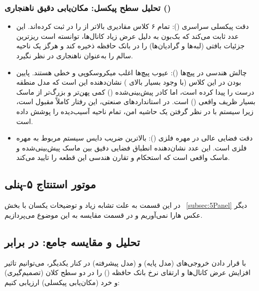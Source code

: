 \documentclass{article}
\begin{document}
\subsubsection{تحلیل سطح پیکسل: مکان‌یابی دقیق ناهنجاری ()}
	\begin{itemize}
		\item دقت پیکسلی سراسری (): تمام ۶ کلاس مقادیری بالاتر از  را در  ثبت کرده‌اند. این عدد ثابت می‌کند که بک‌بون  به دلیل عرض زیاد کانال‌ها، توانسته است ریزترین جزئیات بافتی (لبه‌ها و گرادیان‌ها) را در بانک حافظه ذخیره کند و هرگز یک ناحیه سالم را به‌عنوان ناهنجاری در نظر نگیرد.
		
		\item چالش هندسی در پیچ‌ها (): عیوب پیچ‌ها اغلب میکروسکوپی و خطی هستند. پایین بودن  در این کلاس (با وجود  بسیار بالای ) نشان‌دهنده این است که مدل منطقه درست را پیدا کرده است، اما کادر پیش‌بینی‌شده () کمی پهن‌تر و بزرگ‌تر از ماسک بسیار ظریف واقعی () است. در استانداردهای صنعتی، این رفتار کاملاً مقبول است، زیرا سیستم با در نظر گرفتن یک حاشیه امن، تمام ناحیه آسیب‌دیده را پوشش داده است.
		
		\item دقت فضایی عالی در مهره فلزی (): بالاترین ضریب دایس سیستم مربوط به مهره فلزی است. این عدد نشان‌دهنده انطباق فضایی دقیق بین ماسک پیش‌بینی‌شده و ماسک واقعی است که استحکام و تقارن هندسی این قطعه را تایید می‌کند.
	\end{itemize}



\subsection{موتور استنتاج  ۵-پنلی }
در این قسمت به علت تشابه زیاد و توضیحات یکسان با بخش ~\ref{subsec:5Panel}
دیگر عکس هارا نمی‌آوریم و در قسمت مقایسه به این موضوع می‌پردازیم.


\subsection{تحلیل و مقایسه جامع:  در برابر }

با قرار دادن خروجی‌های  (مدل پایه) و  (مدل پیشرفته) در کنار یکدیگر، می‌توانیم تاثیر افزایش عرض کانال‌ها و ارتقای نرخ بانک حافظه () را در دو سطح کلان (تصمیم‌گیری) و خرد (مکان‌یابی پیکسلی) ارزیابی کنیم:
\end{document}
